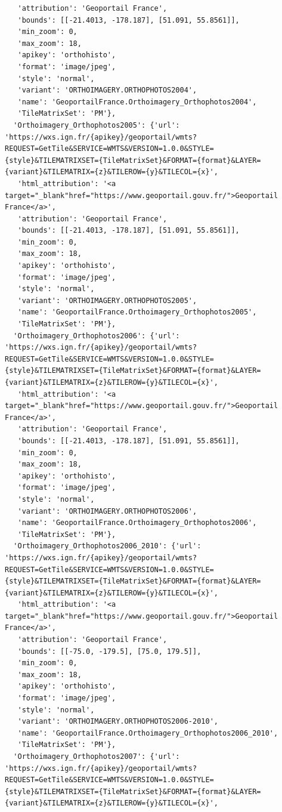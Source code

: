 \documentclass[
  letterpaper,
  DIV=11,
  numbers=noendperiod]{scrreprt}
\begin{document}
\begin{verbatim}
   'attribution': 'Geoportail France',
   'bounds': [[-21.4013, -178.187], [51.091, 55.8561]],
   'min_zoom': 0,
   'max_zoom': 18,
   'apikey': 'orthohisto',
   'format': 'image/jpeg',
   'style': 'normal',
   'variant': 'ORTHOIMAGERY.ORTHOPHOTOS2004',
   'name': 'GeoportailFrance.Orthoimagery_Orthophotos2004',
   'TileMatrixSet': 'PM'},
  'Orthoimagery_Orthophotos2005': {'url': 'https://wxs.ign.fr/{apikey}/geoportail/wmts?REQUEST=GetTile&SERVICE=WMTS&VERSION=1.0.0&STYLE={style}&TILEMATRIXSET={TileMatrixSet}&FORMAT={format}&LAYER={variant}&TILEMATRIX={z}&TILEROW={y}&TILECOL={x}',
   'html_attribution': '<a target="_blank"href="https://www.geoportail.gouv.fr/">Geoportail France</a>',
   'attribution': 'Geoportail France',
   'bounds': [[-21.4013, -178.187], [51.091, 55.8561]],
   'min_zoom': 0,
   'max_zoom': 18,
   'apikey': 'orthohisto',
   'format': 'image/jpeg',
   'style': 'normal',
   'variant': 'ORTHOIMAGERY.ORTHOPHOTOS2005',
   'name': 'GeoportailFrance.Orthoimagery_Orthophotos2005',
   'TileMatrixSet': 'PM'},
  'Orthoimagery_Orthophotos2006': {'url': 'https://wxs.ign.fr/{apikey}/geoportail/wmts?REQUEST=GetTile&SERVICE=WMTS&VERSION=1.0.0&STYLE={style}&TILEMATRIXSET={TileMatrixSet}&FORMAT={format}&LAYER={variant}&TILEMATRIX={z}&TILEROW={y}&TILECOL={x}',
   'html_attribution': '<a target="_blank"href="https://www.geoportail.gouv.fr/">Geoportail France</a>',
   'attribution': 'Geoportail France',
   'bounds': [[-21.4013, -178.187], [51.091, 55.8561]],
   'min_zoom': 0,
   'max_zoom': 18,
   'apikey': 'orthohisto',
   'format': 'image/jpeg',
   'style': 'normal',
   'variant': 'ORTHOIMAGERY.ORTHOPHOTOS2006',
   'name': 'GeoportailFrance.Orthoimagery_Orthophotos2006',
   'TileMatrixSet': 'PM'},
  'Orthoimagery_Orthophotos2006_2010': {'url': 'https://wxs.ign.fr/{apikey}/geoportail/wmts?REQUEST=GetTile&SERVICE=WMTS&VERSION=1.0.0&STYLE={style}&TILEMATRIXSET={TileMatrixSet}&FORMAT={format}&LAYER={variant}&TILEMATRIX={z}&TILEROW={y}&TILECOL={x}',
   'html_attribution': '<a target="_blank"href="https://www.geoportail.gouv.fr/">Geoportail France</a>',
   'attribution': 'Geoportail France',
   'bounds': [[-75.0, -179.5], [75.0, 179.5]],
   'min_zoom': 0,
   'max_zoom': 18,
   'apikey': 'orthohisto',
   'format': 'image/jpeg',
   'style': 'normal',
   'variant': 'ORTHOIMAGERY.ORTHOPHOTOS2006-2010',
   'name': 'GeoportailFrance.Orthoimagery_Orthophotos2006_2010',
   'TileMatrixSet': 'PM'},
  'Orthoimagery_Orthophotos2007': {'url': 'https://wxs.ign.fr/{apikey}/geoportail/wmts?REQUEST=GetTile&SERVICE=WMTS&VERSION=1.0.0&STYLE={style}&TILEMATRIXSET={TileMatrixSet}&FORMAT={format}&LAYER={variant}&TILEMATRIX={z}&TILEROW={y}&TILECOL={x}',

\end{verbatim}
\end{document}
